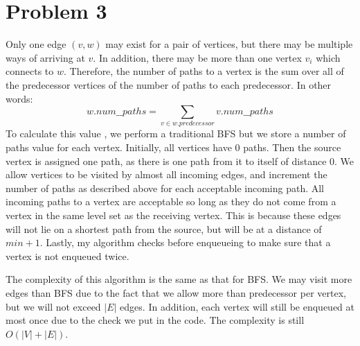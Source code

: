 \documentclass[10pt]{article}
\begin{document}
\section*{Problem 3}
 Only one edge $(v,w)$ may exist for a pair of vertices, but there may be multiple ways of arriving at $v$. In addition, there may be more than one vertex $v_i$ which connects to $w$. Therefore, the number of paths to a vertex is the sum over all of the predecessor vertices of the number of paths to each predecessor. In other words:
 \begin{equation*}
 w.num\_\_paths = \sum\limits_{v\in w.predecessor}v.num\_\_paths
 \end{equation*}
 To calculate this value , we perform a traditional BFS but we store a number of paths value for each vertex. Initially, all vertices have 0 paths. Then the source vertex is assigned one path, as there is one path from it to itself of distance 0. We allow vertices to be visited by almost all incoming edges, and increment the number of paths as described above for each acceptable incoming path. All incoming paths to a vertex are acceptable so long as they do not come from a vertex in the same level set as the receiving vertex. This is because these edges will not lie on a shortest path from the source, but will be at a distance of $min + 1$. Lastly, my algorithm checks before enqueueing to make sure that a vertex is not enqueued twice.
 
 The complexity of this algorithm is the same as that for BFS. We may visit more edges than BFS due to the fact that we allow more than predecessor per vertex, but we will not exceed $|E|$ edges. In addition, each vertex will still be enqueued at most once due to the check we put in the code. The complexity is still $O(|V|+|E|)$.
\end{document}
